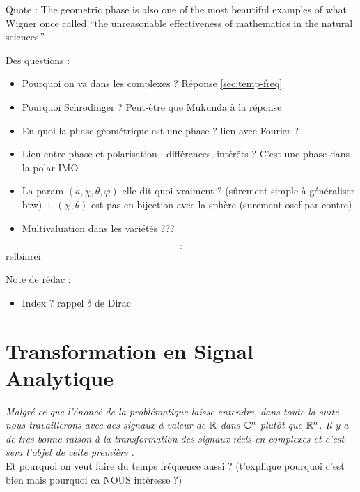 Quote : The geometric phase is also one of the most beautiful examples of what Wigner once called ``the unreasonable effectiveness of mathematics in the natural sciences.'' \cite[p.\,4]{bohm_geometric_2003}

Des questions :
\begin{itemize}
	
	\item Pourquoi on va dans les complexes ? Réponse \cref{sec:temp-freq}
	
	\item Pourquoi Schrödinger ? Peut-être que Mukunda \cite{mukunda_quantum_1993} à la réponse
	
	\item En quoi la phase géométrique est une phase ? lien avec Fourier ?
	
	\item Lien entre phase et polarisation : différences, intérêts ? C'est une phase dans la polar IMO
	
	\item La param $(a,\chi,\theta,\varphi)$ elle dit quoi vraiment ? (sûrement simple à généraliser btw) + $(\chi,\theta)$ est pas en bijection avec la sphère (surement osef par contre)
	
	\item Multivaluation dans les variétés \cite[p. 8]{bohm_geometric_2003} ???
	
\end{itemize}

\[\underline{\overline{\qquad\qquad\qquad\qquad\qquad\qquad\qquad\qquad\qquad\qquad\qquad\qquad\qquad\qquad\qquad\qquad\qquad\qquad}}\]{\color{white}relbinrei}

Note de rédac :
\begin{itemize}
	\item Index ? rappel $\delta$ de Dirac
\end{itemize}


\part{Transformation en Signal Analytique}




\begin{enonce}
	\textit{Malgré ce que l'énoncé de la problématique laisse entendre, dans toute la suite nous travaillerons avec des signaux à valeur de $\mathbb{R}$ dans $\mathbb{C}^n$ plutôt que $\mathbb{R}^n$. Il y a de très bonne raison à la transformation des signaux réels en complexes et c'est sera l'objet de cette première  .}\\
	
	Et pourquoi on veut faire du temps fréquence aussi ? (t'explique pourquoi c'est bien mais pourquoi ca NOUS intéresse ?)
\end{enonce}




